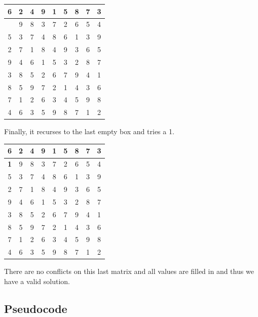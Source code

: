 \documentclass{sig-alternate}
\begin{document}
\begin{center}
  \begin{tabular}{ | c | c | c | c | c | c | c | c | c |}
    \hline
      \textbf{6} & 2 & 4 & 9 & \textbf{1} & 5 & 8 & 7 & 3 \\ \hline
	  & 9 & 8 & 3 & 7 & 2 & 6 & 5 & 4 \\ \hline
	 5 & 3 & 7 & 4 & 8 & 6 & 1 & 3 & 9\\ \hline
	 2 & 7 & 1 & 8 & 4 & 9 & 3 & 6 & 5\\ \hline
	 9 & 4 & 6 & 1 & 5 & 3 & 2 & 8 & 7\\ \hline
	 3 & 8 & 5 & 2 & 6 & 7 & 9 & 4 & 1\\ \hline
     8 & 5 & 9 & 7 & 2 & 1 & 4 & 3 & 6\\ \hline
	 7 & 1 & 2 & 6 & 3 & 4 & 5 & 9 & 8\\ \hline
	 4 & 6 & 3 & 5 & 9 & 8 & 7 & 1 & 2\\ \hline
  \end{tabular}
\end{center}

Finally, it recurses to the last empty box and tries a 1.

\begin{center}
  \begin{tabular}{ | c | c | c | c | c | c | c | c | c |}
    \hline
      \textbf{6} & 2 & 4 & 9 & \textbf{1} & 5 & 8 & 7 & 3 \\ \hline
	 \textbf{1} & 9 & 8 & 3 & 7 & 2 & 6 & 5 & 4 \\ \hline
	 5 & 3 & 7 & 4 & 8 & 6 & 1 & 3 & 9\\ \hline
	 2 & 7 & 1 & 8 & 4 & 9 & 3 & 6 & 5\\ \hline
	 9 & 4 & 6 & 1 & 5 & 3 & 2 & 8 & 7\\ \hline
	 3 & 8 & 5 & 2 & 6 & 7 & 9 & 4 & 1\\ \hline
     8 & 5 & 9 & 7 & 2 & 1 & 4 & 3 & 6\\ \hline
	 7 & 1 & 2 & 6 & 3 & 4 & 5 & 9 & 8\\ \hline
	 4 & 6 & 3 & 5 & 9 & 8 & 7 & 1 & 2\\ \hline
  \end{tabular}
\end{center}

There are no conflicts on this last matrix and all values are filled in and thus we have a valid solution. 

\subsection{Pseudocode}
\end{document}
